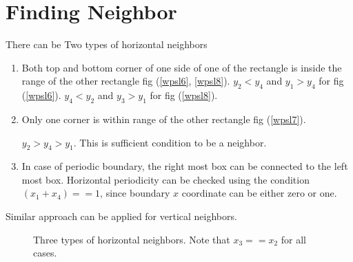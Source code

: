 \documentclass[10pt,a4paper]{report}
\begin{document}
	\section{Finding Neighbor}
	There can be Two types of horizontal neighbors
	\begin{enumerate}
		\item Both top and bottom corner of one side of one of the rectangle is inside the range of the other rectangle fig (\ref{wpsl6}, \ref{wpsl8}).
		$y_2 < y_4$ and $y_1 > y_4$ for fig (\ref{wpsl6}).
		$y_4 < y_2$ and $y_3 > y_1$ for fig (\ref{wpsl8}).
		
		\item Only one corner is within range of the other rectangle fig (\ref{wpsl7}).
		
		 $y_2 > y_4 > y_1$. This is sufficient condition to be a neighbor.
		 
		 \item In case of periodic boundary, the right most box can be connected to the left most box. Horizontal periodicity can be checked using the condition $(x_1 + x_4) == 1$, since boundary $x$ coordinate can be either zero or one.
	\end{enumerate}

	Similar approach can be applied for vertical neighbors.
	\begin{figure}
		\centering
		\caption{Three types of horizontal neighbors. Note that $x_3 == x_2$ for all cases.}
	\end{figure}
	
\end{document}
